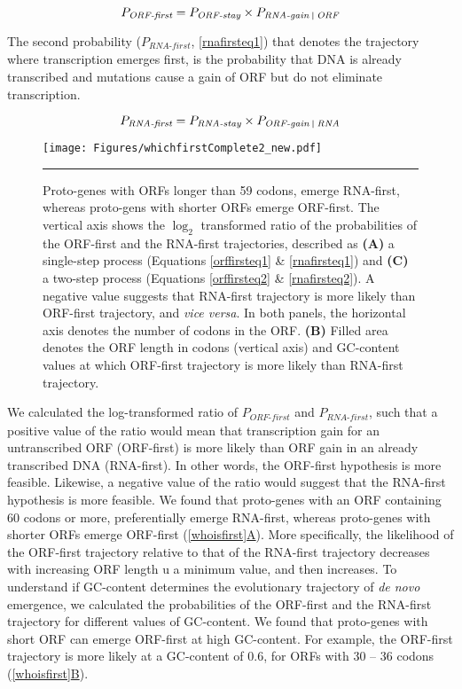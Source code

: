 \documentclass[12pt,a4paper]{article}
\begin{document}
\begin{equation}
P_\textit{ORF-first} = P_\textit{ORF-stay}\times P_\textit{RNA-gain \vline\ ORF}
\label{orffirsteq1}
\end{equation}

The second probability ($P_\textit{RNA-first}$, \autoref{rnafirsteq1}) that denotes the trajectory where transcription emerges first, is the probability that DNA is already transcribed and mutations cause a gain of ORF but do not eliminate transcription. 

\begin{equation}
P_\textit{RNA-first} = P_\textit{RNA-stay}\times P_\textit{ORF-gain \vline\ RNA}
\label{rnafirsteq1}
\end{equation}

\begin{figure}[!t]
\centering
\texttt{[image: Figures/whichfirstComplete2\_new.pdf]}
\caption{Proto-genes with ORFs longer than 59 codons, emerge RNA-first, whereas proto-gens with shorter ORFs emerge ORF-first. The vertical axis shows the $\log_2$ transformed ratio of the probabilities of the ORF-first and the RNA-first trajectories, described as \textbf{(A)} a single-step process (Equations \ref{orffirsteq1} \& \ref{rnafirsteq1}) and \textbf{(C)} a two-step process (Equations \ref{orffirsteq2} \& \ref{rnafirsteq2}). A negative value suggests that RNA-first trajectory is more likely than ORF-first trajectory, and \textit{vice versa}. In both panels, the horizontal axis denotes the number of codons in the ORF. \textbf{(B)} Filled area denotes the ORF length in codons (vertical axis) and GC-content values at which ORF-first trajectory is more likely than RNA-first trajectory.}
\label{whoisfirst}
\vspace{1ex}
\hrule
\end{figure}

We calculated the log-transformed ratio of $P_\textit{ORF-first}$ and $P_\textit{RNA-first}$, such that a positive value of the ratio would mean that transcription gain for an untranscribed ORF (ORF-first) is more likely than ORF gain in an already transcribed DNA (RNA-first). In other words, the ORF-first hypothesis is more feasible. Likewise, a negative value of the ratio would suggest that the RNA-first hypothesis is more feasible. We found that proto-genes with an ORF containing 60 codons or more, preferentially emerge RNA-first, whereas proto-genes with shorter ORFs emerge ORF-first (\hyperref[whoisfirst]{\autoref{whoisfirst}A}). More specifically, the likelihood of the ORF-first trajectory relative to that of the RNA-first trajectory  decreases with increasing ORF length u a minimum value, and then increases. To understand if GC-content determines the evolutionary trajectory of \textit{de novo} emergence, we calculated the probabilities of the ORF-first and the RNA-first trajectory for different values of GC-content. We found that proto-genes with short ORF can emerge ORF-first at high GC-content. For example, the ORF-first trajectory is more likely at a GC-content of 0.6, for ORFs with 30 -- 36 codons (\hyperref[whoisfirst]{\autoref{whoisfirst}B}).
\end{document}
